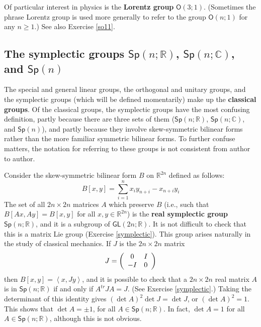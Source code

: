 \documentclass{amsbook}
\theoremstyle{plain}
\numberwithin{equation}{chapter}
\numberwithin{theorem}{chapter}
\begin{document}
Of particular interest in physics is the \textbf{Lorentz group} $\mathsf{O}%
(3;1)$. (Sometimes the phrase Lorentz group is used more generally to refer to
the group $\mathsf{O}(n;1)$ for any $n\geq1$.) See also Exercise \ref{so11}.

\subsection{The symplectic groups $\mathsf{Sp}(n;\mathbb{R})$, $\mathsf{Sp}%
(n;\mathbb{C})$, and $\mathsf{Sp}(n)$}

The special and general linear groups, the orthogonal and unitary groups, and
the symplectic groups (which will be defined momentarily) make up the
\textbf{classical groups}. Of the classical groups, the symplectic groups have
the most confusing definition, partly because there are three sets of them
($\mathsf{Sp}(n;\mathbb{R})$, $\mathsf{Sp}(n;\mathbb{C})$, and $\mathsf{Sp}(n)
$), and partly because they involve skew-symmetric bilinear forms rather than
the more familiar symmetric bilinear forms. To further confuse matters, the
notation for referring to these groups is not consistent from author to author.

Consider the skew-symmetric bilinear form $B$ on $\mathbb{R}^{2n}$ defined as
follows:
\begin{equation}
B\left[  x,y\right]  =\sum_{i=1}^{n}x_{i}y_{n+i}-x_{n+i}y_{i}\label{skew.form}%
\end{equation}
The set of all $2n\times2n$ matrices $A$ which preserve $B$ (i.e., such that
$B\left[  Ax,Ay\right]  =B\left[  x,y\right]  $ for all $x,y\in\mathbb{R}^{2n}
$) is the \textbf{real symplectic group} $\mathsf{Sp}(n;\mathbb{R})$, and it
is a subgroup of $\mathsf{GL}(2n;\mathbb{R})$. It is not difficult to check
that this is a matrix Lie group (Exercise \ref{symplectic}). This group arises
naturally in the study of classical mechanics. If $J$ is the $2n\times2n$
matrix
\[
J=\left(
\begin{array}
[c]{cc}%
0 & I\\
-I & 0
\end{array}
\right)
\]
then $B\left[  x,y\right]  =\left\langle x,Jy\right\rangle $, and it is
possible to check that a $2n\times2n$ real matrix $A$ is in $\mathsf{Sp}%
(n;\mathbb{R})$ if and only if $A^{tr}JA=J$. (See Exercise \ref{symplectic}.)
Taking the determinant of this identity gives $\left(  \det A\right)  ^{2}\det
J=\det J$, or $\left(  \det A\right)  ^{2}=1$. This shows that $\det A=\pm1$,
for all $A\in\mathsf{Sp}(n;\mathbb{R})$. In fact, $\det A=1$ for all
$A\in\mathsf{Sp}(n;\mathbb{R})$, although this is not obvious.
\end{document}
